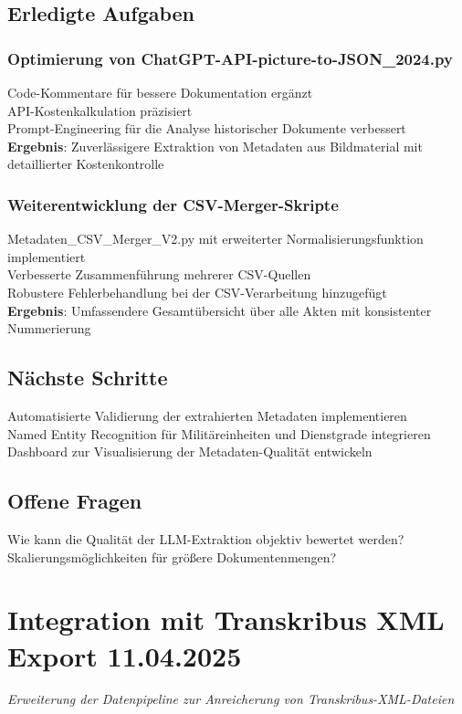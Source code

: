 \documentclass{article}
\begin{document}
\subsection*{Erledigte Aufgaben}
\subsubsection*{\small Optimierung von ChatGPT-API-picture-to-JSON\_2024.py}
 Code-Kommentare für bessere Dokumentation ergänzt\\
 API-Kostenkalkulation präzisiert\\
 Prompt-Engineering für die Analyse historischer Dokumente verbessert\\
\textbf{Ergebnis}: Zuverlässigere Extraktion von Metadaten aus Bildmaterial mit detaillierter Kostenkontrolle

\subsubsection*{\small Weiterentwicklung der CSV-Merger-Skripte}
 Metadaten\_CSV\_Merger\_V2.py mit erweiterter Normalisierungsfunktion implementiert\\
 Verbesserte Zusammenführung mehrerer CSV-Quellen\\
 Robustere Fehlerbehandlung bei der CSV-Verarbeitung hinzugefügt\\
\textbf{Ergebnis}: Umfassendere Gesamtübersicht über alle Akten mit konsistenter Nummerierung

\subsection*{Nächste Schritte}
 Automatisierte Validierung der extrahierten Metadaten implementieren\\
 Named Entity Recognition für Militäreinheiten und Dienstgrade integrieren\\
 Dashboard zur Visualisierung der Metadaten-Qualität entwickeln

\subsection*{Offene Fragen}
 Wie kann die Qualität der LLM-Extraktion objektiv bewertet werden?\\
 Skalierungsmöglichkeiten für größere Dokumentenmengen?

\section{Integration mit Transkribus XML Export \small 11.04.2025}
\small\textit{Erweiterung der Datenpipeline zur Anreicherung von Transkribus-XML-Dateien}\\
\end{document}
